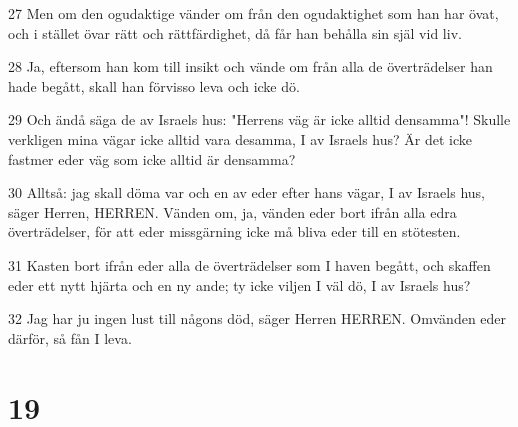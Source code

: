\par 27 Men om den ogudaktige vänder om från den ogudaktighet som han har övat, och i stället övar rätt och rättfärdighet, då får han behålla sin själ vid liv.
\par 28 Ja, eftersom han kom till insikt och vände om från alla de överträdelser han hade begått, skall han förvisso leva och icke dö.
\par 29 Och ändå säga de av Israels hus: "Herrens väg är icke alltid densamma"! Skulle verkligen mina vägar icke alltid vara desamma, I av Israels hus? Är det icke fastmer eder väg som icke alltid är densamma?
\par 30 Alltså: jag skall döma var och en av eder efter hans vägar, I av Israels hus, säger Herren, HERREN. Vänden om, ja, vänden eder bort ifrån alla edra överträdelser, för att eder missgärning icke må bliva eder till en stötesten.
\par 31 Kasten bort ifrån eder alla de överträdelser som I haven begått, och skaffen eder ett nytt hjärta och en ny ande; ty icke viljen I väl dö, I av Israels hus?
\par 32 Jag har ju ingen lust till någons död, säger Herren HERREN. Omvänden eder därför, så fån I leva.

\chapter{19}

